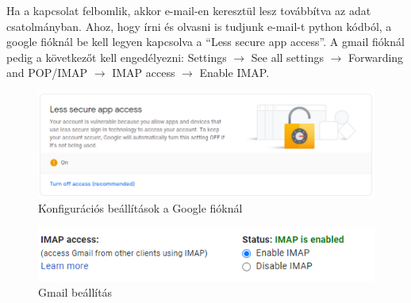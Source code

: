 \documentclass[12pt,a4paper,oneside]{report}
\begin{document}
Ha a kapcsolat felbomlik, akkor e-mail-en keresztül lesz továbbítva az adat csatolmányban. Ahoz, hogy írni és olvasni is tudjunk e-mail-t python kódból, a google fióknál be kell legyen kapcsolva a ``Less secure app access''. A gmail fióknál pedig a következőt kell engedélyezni: Settings $\rightarrow$ See all settings $\rightarrow$ Forwarding and POP/IMAP $\rightarrow$ IMAP access $\rightarrow$ Enable IMAP.
\begin{figure}[H]
\centering
\includegraphics[width=400pt]{../images/lesssecureapp}
\caption{Konfigurációs beállítások a Google fióknál}
\label{fig:IMAPsettings}
\end{figure}
\begin{figure}[H]
\centering
\includegraphics{../images/enableIMAP}
\caption{Gmail beállítás}
\label{fig:IMAPsettings}
\end{figure}
\end{document}
